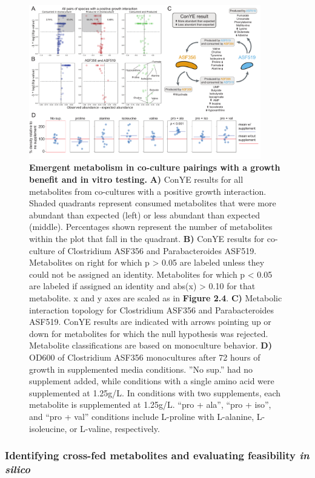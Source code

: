 \documentclass[11pt,twocolumn,notitlepage,openany,twoside]{book}
\begin{document}
\begin{refsection}
\begin{figure}[tb!]
\centering
\includegraphics[width=0.9\textwidth]{ch2_fig6}
\caption[Emergent metabolism in co-culture pairings with a growth benefit and in vitro testing.]{\textbf{Emergent metabolism in co-culture pairings with a growth benefit and in vitro testing.} \textbf{A)} ConYE results for all metabolites from co-cultures with a positive growth interaction. Shaded quadrants represent consumed metabolites that were more abundant than expected (left) or less abundant than expected (middle). Percentages shown represent the number of metabolites within the plot that fall in the quadrant. \textbf{B)} ConYE results for co-culture of Clostridium ASF356 and Parabacteroides ASF519. Metabolites on right for which p > 0.05 are labeled unless they could not be assigned an identity. Metabolites for which p < 0.05 are labeled if assigned an identity and abs(x) > 0.10 for that metabolite. x and y axes are scaled as in \textbf{Figure 2.4}. \textbf{C)} Metabolic interaction topology for Clostridium ASF356 and Parabacteroides ASF519. ConYE results are indicated with arrows pointing up or down for metabolites for which the null hypothesis was rejected. Metabolite classifications are based on monoculture behavior. \textbf{D)} OD600 of Clostridium ASF356 monocultures after 72 hours of growth in supplemented media conditions. ”No sup.” had no supplement added, while conditions with a single amino acid were supplemented at 1.25g/L. In conditions with two supplements, each metabolite is supplemented at 1.25g/L. “pro + ala”, “pro + iso”, and “pro + val” conditions include L-proline with L-alanine, L-isoleucine, or L-valine, respectively.}
\end{figure}

\subsubsection{Identifying cross-fed metabolites and evaluating feasibility \textit{in silico}}


\end{refsection}
\end{document}
